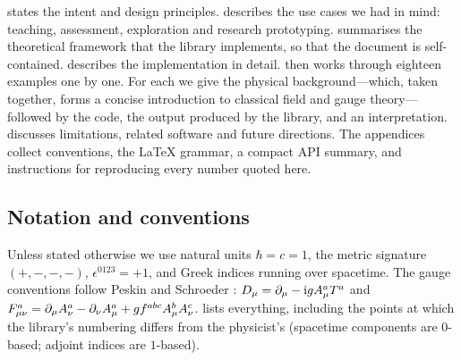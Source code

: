  states the intent and design principles.  describes the use cases we had in mind: teaching, assessment, exploration and research prototyping.  summarises the theoretical framework that the library implements, so that the document is self-contained.  describes the implementation in detail.  then works through eighteen examples one by one. For each we give the physical background---which, taken together, forms a concise introduction to classical field and gauge theory---followed by the code, the output produced by the library, and an interpretation.  discusses limitations, related software and future directions. The appendices collect conventions, the \LaTeX{} grammar, a compact API summary, and instructions for reproducing every number quoted here.

\subsection{Notation and conventions}

Unless stated otherwise we use natural units $\hbar=c=1$, the metric signature $(+,-,-,-)$, $\epsilon^{0123}=+1$, and Greek indices running over spacetime. The gauge conventions follow Peskin and Schroeder \cite{PeskinSchroeder}: $D_\mu=\partial_\mu-\mathrm{i} g A_\mu^aT^a$ and $F^a_{\mu\nu}=\partial_\mu A_\nu^a-\partial_\nu A_\mu^a+gf^{abc}A_\mu^bA_\nu^c$.  lists everything, including the points at which the library's numbering differs from the physicist's (spacetime components are $0$-based; adjoint indices are $1$-based).
